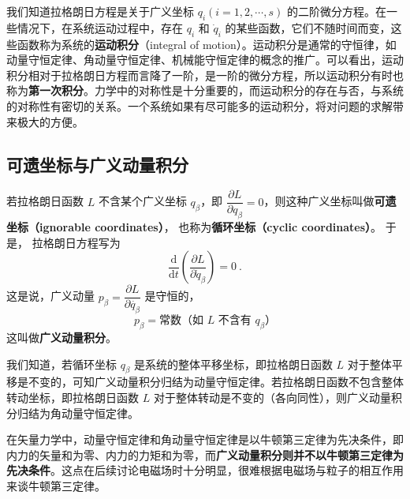 

我们知道拉格朗日方程是关于广义坐标 $q_i(i=1,2,\cdots,s)$ 的二阶微分方程。在一些情况下，在系统运动过程中，存在 $q_i$ 和 $\dot{q}_i$ 的某些函数，它们不随时间而变，这些函数称为系统的\textbf{运动积分}（integral of motion）。运动积分是通常的守恒律，如动量守恒定律、角动量守恒定律、机械能守恒定律的概念的推广。可以看出，运动积分相对于拉格朗日方程而言降了一阶，是一阶的微分方程，所以运动积分有时也称为\textbf{第一次积分}。力学中的对称性是十分重要的，而运动积分的存在与否，与系统的对称性有密切的关系。一个系统如果有尽可能多的运动积分，将对问题的求解带来极大的方便。

\subsection{可遗坐标与广义动量积分}

若拉格朗日函数 $L$ 不含某个广义坐标 $q_\beta$，即 $\dfrac{\partial L}{\partial q_\beta}=0$，则这种广义坐标叫做\textbf{可遗坐标（ignorable coordinates）}， 也称为\textbf{循环坐标（cyclic coordinates）}。 于是， 拉格朗日方程写为
\begin{equation}
\frac{\mathrm{d}}{\mathrm{d} t}\left(\frac{\partial L}{\partial \dot{q}_{\beta}}\right)=0~.
\end{equation}
这是说，广义动量 $p_\beta=\dfrac{\partial L} {\partial \dot{q_\beta}}$ 是守恒的，
\begin{equation}
p_\beta= \text{常数（如 $L$ 不含有 $q_\beta$）}
\end{equation}
这叫做\textbf{广义动量积分}。

我们知道，若循环坐标 $q_\beta$ 是系统的整体平移坐标，即拉格朗日函数 $L $ 对于整体平移是不变的，可知广义动量积分归结为动量守恒定律。若拉格朗日函数不包含整体转动坐标，即拉格朗日函数 $L$ 对于整体转动是不变的（各向同性），则广义动量积分归结为角动量守恒定律。

在矢量力学中，动量守恒定律和角动量守恒定律是以牛顿第三定律为先决条件，即内力的矢量和为零、内力的力矩和为零，而\textbf{广义动量积分则并不以牛顿第三定律为先决条件}。这点在后续讨论电磁场时十分明显，很难根据电磁场与粒子的相互作用来谈牛顿第三定律。

